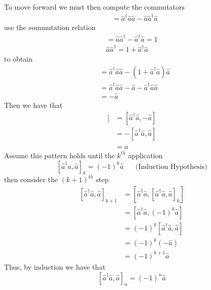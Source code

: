 \documentclass[aps,pra,showpacs,amsmath,amssymb,nofootinbib,longbibliography,superscriptaddress
]{revtex4-1}
\theoremstyle{definition}
\theoremstyle{remark}
\newcommand{\0}{\hat{0}}
\begin{document}
To move forward we must then compute the commutators
\begin{align}
    [\hat{a}^{\dagger} \hat{a}, \hat{a}] &=
    \hat{a}^{\dagger} \hat{a} \hat{a} - \hat{a} \hat{a}^{\dagger} \hat{a} \nonumber
\end{align}
use the commutation relation
\begin{align}
    [\hat{a}, \hat{a}^{\dagger}] = \hat{a} \hat{a}^{\dagger} - \hat{a}^{\dagger} \hat{a} = 1 \nonumber\\
    \hat{a} \hat{a}^{\dagger} = 1 + \hat{a}^{\dagger} \hat{a}
\end{align}
to obtain
\begin{align}
    [\hat{a}^{\dagger} \hat{a}, \hat{a}] &= \hat{a}^{\dagger} \hat{a} \hat{a} - (1 + \hat{a}^{\dagger} \hat{a}) \hat{a} \nonumber \\
    &= \hat{a}^{\dagger} \hat{a} \hat{a} - \hat{a} - \hat{a}^{\dagger} \hat{a}\hat{a} \nonumber \\
    &= - \hat{a}
\end{align}
Then we have that
\begin{align}
    [\hat{a}^{\dagger} \hat{a}, [\hat{a}^{\dagger} \hat{a}, \hat{a}]] &= [\hat{a}^{\dagger} \hat{a}, -\hat{a}] \nonumber \\
    &= -[\hat{a}^{\dagger} \hat{a}, \hat{a}] \nonumber \\
    &= \hat{a}
\end{align}
Assume this pattern holds until the $k^{th}$ application
\begin{equation}
    {[\hat{a}^{\dagger} \hat{a}, \hat{a}]}_{k} = {(-1)}^k \hat{a}\;\;\;\;\;\;\text{(Induction Hypothesis)}
\end{equation}
then consider the ${(k+1)}^{th}$ step
\begin{align}
    {[\hat{a}^{\dagger} \hat{a}, \hat{a}]}_{k+1} &= [\hat{a}^{\dagger} \hat{a}, {[\hat{a}^{\dagger} \hat{a}, \hat{a}]}_{k}] \nonumber \\
    &= [\hat{a}^{\dagger} \hat{a}, {(-1)}^k \hat{a}] \nonumber \\
    &= {(-1)}^k [\hat{a}^{\dagger} \hat{a}, \hat{a}] \nonumber \\
    &= {(-1)}^k (-\hat{a}) \nonumber \\
    &= {(-1)}^{k+1} \hat{a} \nonumber
\end{align}
Thus, by induction we have that
\begin{equation}
    {[\hat{a}^{\dagger} \hat{a}, \hat{a}]}_{n} = {(-1)}^{n} \hat{a}
\end{equation}
\end{document}
